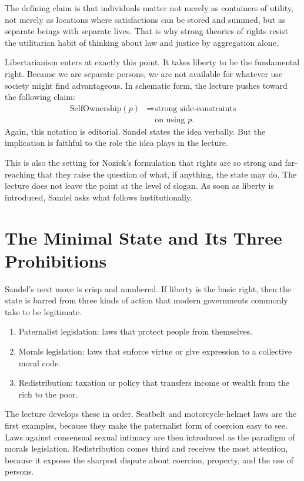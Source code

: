 The defining claim is that individuals matter not merely as containers of utility, not merely as locations where satisfactions can be stored and summed, but as separate beings with separate lives. That is why strong theories of rights resist the utilitarian habit of thinking about law and justice by aggregation alone.

Libertarianism enters at exactly this point. It takes liberty to be the fundamental right. Because we are separate persons, we are not available for whatever use society might find advantageous. In schematic form, the lecture pushes toward the following claim:
\begin{equation}
\begin{aligned}
\text{SelfOwnership}(p)
&\Longrightarrow \text{strong side-constraints} \\
&\quad \text{on using }p.
\end{aligned}
\end{equation}
Again, this notation is editorial. Sandel states the idea verbally. But the implication is faithful to the role the idea plays in the lecture.

This is also the setting for Nozick's formulation that rights are so strong and far-reaching that they raise the question of what, if anything, the state may do. The lecture does not leave the point at the level of slogan. As soon as liberty is introduced, Sandel asks what follows institutionally.

\section{The Minimal State and Its Three Prohibitions}

Sandel's next move is crisp and numbered. If liberty is the basic right, then the state is barred from three kinds of action that modern governments commonly take to be legitimate.

\begin{enumerate}
\item Paternalist legislation: laws that protect people from themselves.
\item Morals legislation: laws that enforce virtue or give expression to a collective moral code.
\item Redistribution: taxation or policy that transfers income or wealth from the rich to the poor.
\end{enumerate}

The lecture develops these in order. Seatbelt and motorcycle-helmet laws are the first examples, because they make the paternalist form of coercion easy to see. Laws against consensual sexual intimacy are then introduced as the paradigm of morals legislation. Redistribution comes third and receives the most attention, because it exposes the sharpest dispute about coercion, property, and the use of persons.

